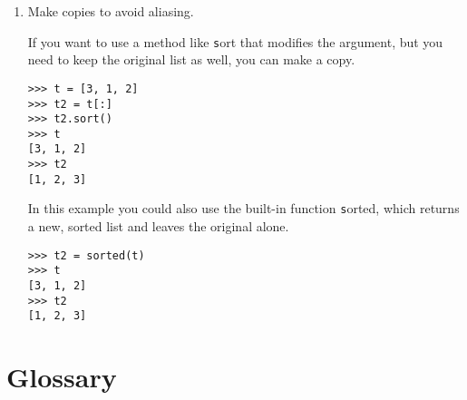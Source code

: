 \documentclass[
DIV=11,
fontsize=12,
twoside,
headinclude=false,
titlepage=firstiscover,
abstract=true,
headsepline=true,
footsepline=true,
chapterprefix=true, %
headings=big,
bibliography=totoc,%
captions=tableheading
]{scrbook}
\theoremstyle{definition}
\begin{document}
\begin{enumerate}
\item Make copies to avoid aliasing.

If you want to use a method like {\texttt sort} that modifies
the argument, but you need to keep the original list as
well, you can make a copy.

\begin{lstlisting}
>>> t = [3, 1, 2]
>>> t2 = t[:]
>>> t2.sort()
>>> t
[3, 1, 2]
>>> t2
[1, 2, 3]
\end{lstlisting}

In this example you could also use the built-in function {\texttt sorted},
which returns a new, sorted list and leaves the original alone.

\begin{lstlisting}
>>> t2 = sorted(t)
>>> t
[3, 1, 2]
>>> t2
[1, 2, 3]
\end{lstlisting}

\end{enumerate}



\section{Glossary}
\end{document}
